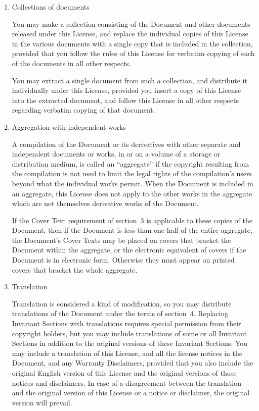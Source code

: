 \begin{enumerate}
\item Collections of documents

You may make a collection consisting of the Document and other documents
released under this License, and replace the individual copies of this
License in the various documents with a single copy that is included in
the collection, provided that you follow the rules of this License for
verbatim copying of each of the documents in all other respects.

You may extract a single document from such a collection, and distribute
it individually under this License, provided you insert a copy of this
License into the extracted document, and follow this License in all
other respects regarding verbatim copying of that document.


\item Aggregation with independent works

A compilation of the Document or its derivatives with other separate
and independent documents or works, in or on a volume of a storage or
distribution medium, is called an ``aggregate'' if the copyright
resulting from the compilation is not used to limit the legal rights
of the compilation's users beyond what the individual works permit.
When the Document is included in an aggregate, this License does not
apply to the other works in the aggregate which are not themselves
derivative works of the Document.

If the Cover Text requirement of section~3 is applicable to these
copies of the Document, then if the Document is less than one half of
the entire aggregate, the Document's Cover Texts may be placed on
covers that bracket the Document within the aggregate, or the
electronic equivalent of covers if the Document is in electronic form.
Otherwise they must appear on printed covers that bracket the whole
aggregate.

\item Translation

Translation is considered a kind of modification, so you may
distribute translations of the Document under the terms of section~4.
Replacing Invariant Sections with translations requires special
permission from their copyright holders, but you may include
translations of some or all Invariant Sections in addition to the
original versions of these Invariant Sections.  You may include a
translation of this License, and all the license notices in the
Document, and any Warranty Disclaimers, provided that you also include
the original English version of this License and the original versions
of those notices and disclaimers.  In case of a disagreement between
the translation and the original version of this License or a notice
or disclaimer, the original version will prevail.


\end{enumerate}
